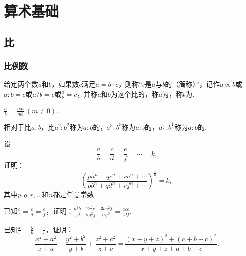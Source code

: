\chapter{算术基础}

\section{比}
\subsection{比例数}
\begin{definition}
给定两个数\(a\)和\(b\)，如果数\(c\)满足\(a=b \cdot c\)，则称“\(c\)是\(a\)与\(b\)的（简称）”，记作\(a \propto b\)或\(a:b=c\)或\(a/b=c\)或\(\frac{a}{b}=c\)，并称\(a\)和\(b\)为这个比的，称\(a\)为，称\(b\)为.
\end{definition}

\begin{property}
\(\frac{a}{b} = \frac{ma}{mb}\ (m\neq0)\).
\end{property}

\begin{definition}
相对于比\(a:b\)，比\(a^2:b^2\)称为\(a:b\)的，\(a^3:b^3\)称为\(a:b\)的，\(a^{\frac{1}{2}}:b^{\frac{1}{2}}\)称为\(a:b\)的.
\end{definition}

\begin{example}
设\[
\frac{a}{b} = \frac{c}{d} = \frac{e}{f} = \dotsb = k,
\]证明：\[
\left(\frac{p a^n + q c^n + r e^n + \dotsb}{p b^n + q d^n + r f^n + \dotsb}\right)^{\frac{1}{n}} = k,
\]其中\(p,q,r,\dotsc\)和\(n\)都是任意常数.
\end{example}

\begin{example}
已知\(\frac{a}{b}=\frac{c}{d}=\frac{e}{f}\)，证明：\(\frac{a^3b+2c^2e-3ae^2f}{b^4+2d^2f-3bf^3} = \frac{ace}{bdf}\).
\end{example}

\begin{example}
已知\(\frac{x}{a}=\frac{y}{b}=\frac{z}{c}\)，证明：\[
\frac{x^2+a^2}{x+a}+\frac{y^2+b^2}{y+b}+\frac{z^2+c^2}{z+c}
= \frac{(x+y+z)^2+(a+b+c)^2}{x+y+z+a+b+c}.
\]
\end{example}

